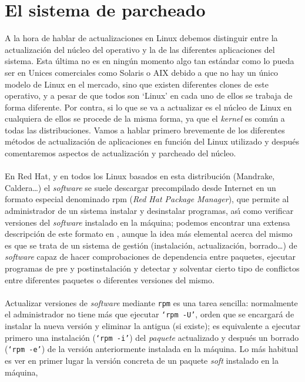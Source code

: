 \section{El sistema de parcheado}
A la hora de hablar de actualizaciones en Linux debemos distinguir entre la 
actualizaci\'on del n\'ucleo del operativo y la de las diferentes aplicaciones 
del sistema. Esta \'ultima no es en ning\'un momento algo tan est\'andar como 
lo pueda ser en Unices comerciales como Solaris o AIX debido a que no hay un 
\'unico modelo de Linux en el mercado, sino que existen diferentes clones de 
este operativo, y a pesar de que todos son `Linux' en cada uno de ellos se 
trabaja de forma diferente. Por contra, si lo que se va a actualizar es el 
n\'ucleo de Linux en cualquiera de ellos se procede de la misma forma, ya que
el {\it kernel} es com\'un a todas las distribuciones. Vamos a hablar primero
brevemente de los diferentes m\'etodos de actualizaci\'on de aplicaciones en
funci\'on del Linux utilizado y despu\'es comentaremos aspectos de 
actualizaci\'on y parcheado del n\'ucleo.\\
\\En Red Hat, y en todos los Linux basados en esta distribuci\'on (Mandrake, 
Caldera\ldots) el {\it software} se suele descargar precompilado desde Internet
en un formato especial denominado {\sc rpm} ({\it Red Hat Package Manager}),
que permite al administrador de un sistema instalar y desinstalar programas,
as\'{\i} como verificar versiones del {\it software} instalado en la 
m\'aquina; podemos encontrar una extensa descripci\'on de este formato en 
\cite{kn:bai97}, aunque la idea m\'as elemental acerca del mismo es que se trata
de un sistema de gesti\'on (instalaci\'on, actualizaci\'on, borrado\ldots) de
{\it software} capaz de hacer comprobaciones de dependencia entre paquetes, 
ejecutar programas de pre y postinstalaci\'on y detectar y solventar cierto tipo
de conflictos entre diferentes paquetes o diferentes versiones del mismo.\\
\\Actualizar versiones de {\it software} mediante {\tt rpm} es una tarea 
sencilla: normalmente el administrador no tiene m\'as que ejecutar {\tt `rpm 
-U'}, orden 
que se encargar\'a de instalar la nueva versi\'on y eliminar la antigua (si 
existe); es equivalente a ejecutar primero una instalaci\'on ({\tt `rpm -i'}) 
del {\it paquete} actualizado y despu\'es un borrado ({\tt `rpm -e'}) de la
versi\'on anteriormente instalada en la m\'aquina. Lo m\'as habitual es ver en 
primer lugar
la versi\'on concreta de un paquete {\it soft} instalado en la m\'aquina, 
